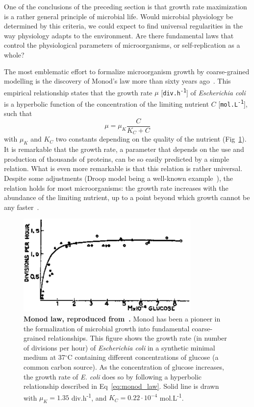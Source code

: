 One of the conclusions of the preceding section is that growth rate maximization is a rather general principle of microbial life.
Would microbial physiology be determined by this criteria, we could expect to find universal regularities in the way physiology adapts to the environment.
Are there fundamental laws that control the physiological parameters of microorganisms, or self-replication as a whole?

The most emblematic effort to formalize microorganism growth by coarse-grained modelling is the discovery of Monod's law more than sixty years ago~\cite{monod_growth_1949}.
This empirical relationship states that the growth rate $\mu$ [\texttt{div.h\textsuperscript{-1}}] of \textit{Escherichia coli} is a hyperbolic function of the concentration of the limiting nutrient $C$ [\texttt{mol.L\textsuperscript{-1}}], such that
\begin{equation}
\label{eq:monod_law}
\mu = \mu_K \frac{C}{K_C + C}
\end{equation}
with $\mu_K$ and $K_C$ two constants depending on the quality of the nutrient (Fig~\ref{fig:monod_law}).
It is remarkable that the growth rate, a parameter that depends on the use and production of thousands of proteins, can be so easily predicted by a simple relation.
What is even more remarkable is that this relation is rather universal.
Despite some adjustments (Droop model being a well-known example~\cite{droop_thoughts_1973}), the relation holds for most microorganisms: the growth rate increases with the abundance of the limiting nutrient, up to a point beyond which growth cannot be any faster~\cite{koch_why_1988}.

\begin{figure}[tb]
\centering
\includegraphics[height=5cm]{./Fig/Chapter1/monod_law.eps}
\caption{
\textbf{Monod law, reproduced from~\cite{monod_growth_1949}.}
Monod has been a pioneer in the formalization of microbial growth into fundamental coarse-grained relationships.
This figure shows the growth rate (in number of divisions per hour) of \textit{Escherichia coli} in a synthetic minimal medium at 37$^{\circ}$C containing different concentrations of glucose (a common carbon source).
As the concentration of glucose increases, the growth rate of \textit{E. coli} does so by following a hyperbolic relationship described in Eq~\ref{eq:monod_law}.
Solid line is drawn with $\mu_K = 1.35$ div.h\textsuperscript{-1}, and $K_C = 0.22 \cdot 10^{-4}$ mol.L\textsuperscript{-1}.
}
\label{fig:monod_law}
\end{figure}


